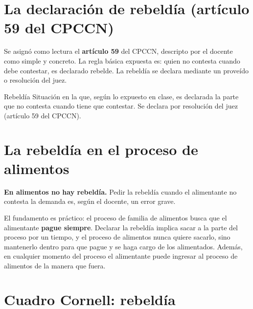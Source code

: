 \documentclass[12pt,oneside]{book}
\begin{document}
\section{La declaración de rebeldía (artículo 59 del CPCCN)}

Se asignó como lectura el \textbf{artículo 59} del CPCCN, descripto por el docente como simple y concreto. La regla básica expuesta es: quien no contesta cuando debe contestar, es declarado rebelde. La rebeldía se declara mediante un proveído o resolución del juez.

\begin{definition}{Rebeldía}
Situación en la que, según lo expuesto en clase, es declarada la parte que no contesta cuando tiene que contestar. Se declara por resolución del juez (artículo 59 del CPCCN).
\end{definition}


\section{La rebeldía en el proceso de alimentos}

\begin{important}
\textbf{En alimentos no hay rebeldía.} Pedir la rebeldía cuando el alimentante no contesta la demanda es, según el docente, un error grave.
\end{important}

El fundamento es práctico: el proceso de familia de alimentos busca que el alimentante \textbf{pague siempre}. Declarar la rebeldía implica sacar a la parte del proceso por un tiempo, y el proceso de alimentos nunca quiere sacarlo, sino mantenerlo dentro para que pague y se haga cargo de los alimentados. Además, en cualquier momento del proceso el alimentante puede ingresar al proceso de alimentos de la manera que fuera.

\section{Cuadro Cornell: rebeldía}
\end{document}
